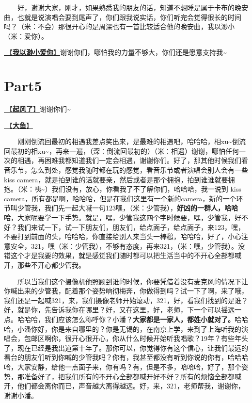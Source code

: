 \documentclass[]{ctexbook}
\begin{document}
  好，谢谢大家，刚才，如果熟悉我的朋友的话，知道不想睡是属于卡布的晚安曲，也就是说演唱会要到尾声了，你们跟我说实话，你们听完会觉得很长的时间吗？（米：不会）那很开心的是周深也有一首比较适合他的晚安曲，我以渺小（米：爱你）。

\hyperref[loving-you-in-my-humble-way]{🎵【\textbf{我以渺小爱你}】}谢谢你们，哪怕我的力量不够大，你们还是愿意支持我\textasciitilde{}

\section{Part5}\label{shanghai-20240518-part5}

\hyperref[the-wind-rises]{🎵【\textbf{起风了}】}谢谢你们\textasciitilde{}

\hyperref[big-fish]{🎵【\textbf{大鱼}】}

  刚刚倒流回最初的相遇我差点笑出来，是最难的相遇吧，哈哈哈，相xu\textasciitilde 倒流回最初的相xu\textasciitilde，再来一遍，（深：倒流回最初的）（米：相遇）谢谢，哪怕任何一次的相遇，再困难我都知道我们一定会相遇，谢谢你们。好了，那其他时候我们看音乐节，怎么到处，感觉我随时都在玩的感觉，看音乐节或者演唱会别人会有一些kiss camera，就是拍到谁的话就要亲，然后或者是那个拥抱，拍到谁谁就要拥抱。（米：咦\textasciitilde）我们没有，放心，你看我了不了解你们，哈哈哈，我一说到 kiss camera，所有都是啊，哈哈哈，但是在我们这里有一个新的camera，新的一个环节叫少管我，我们先一起大喊一句123嘿，（米：少管我），\textbf{好凶的一群人，哈哈哈}，大家呢要学一下手势。就是，嘿，少管我这四个字时候要，嘿，少管我，好不好？我们来试一下，试一下朋友们，朋友们，给点面子，给点面子，来123，嘿，不要打到前面的头，哈哈哈，你直接给别人来当头一棒槌，哈哈哈，好了，小心注意安全，321，嘿（米：少管我），不够有态度，再来321，（米：嘿，少管我）。没错这个才是我要的效果，就是感觉我们随时都可以把生活当中的不开心全部都喊开，那些不开心都少管我。

  所以当我们这个摄像机他照顾到谁的时候，你要凭借着没有麦克风的情况下让你喊出来的少管我，配着那个姿势响彻梅奔，你做得到吗？试一下了啊，来了哦，我们还是一起喊321，来，我们摄像老师开始滚动，321，好，看我们找到的是谁？好，就是你，先告诉我你在哪里？好，又在这里，好，老师，下一个可以摇远一点。哈哈哈，我们应该怎么称呼你？小潘？\textbf{大家都是一家人，都姓小就对了。}哈哈哈，小潘你好，你是来自哪里的？你是无锡的，在南京上学，来到了上海听我的演唱会，包邮区啊你，很开心很开心，你从什么时候开始听我唱歌？19年？有些年头了，现在已经是我出道第十年了。那你可以，你觉得你有这个信心，让我们最远的看台的朋友们听到你喊的少管我吗？你有，我甚至都没有听到你说的你有，哈哈哈哈，大家安静，给他一点面子来，你有吗？有，但是不多，哈哈哈，好了，那个姿势，那准备好了，把我们所有的不开心全部都喊开好不好？所有的烦恼全部都喊开，他们都会离你而已，声音越大离得越远。好，来，321，老师帮我，谢谢你，谢谢小潘。
\end{document}
